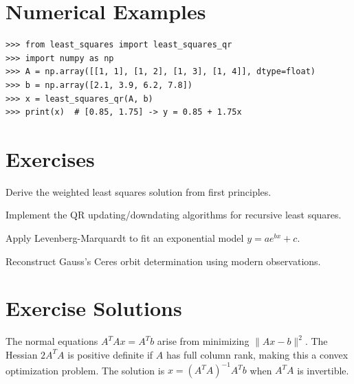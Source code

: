 \section{Numerical Examples}

\begin{example}
\begin{lstlisting}[style=python]
>>> from least_squares import least_squares_qr
>>> import numpy as np
>>> A = np.array([[1, 1], [1, 2], [1, 3], [1, 4]], dtype=float)
>>> b = np.array([2.1, 3.9, 6.2, 7.8])
>>> x = least_squares_qr(A, b)
>>> print(x)  # [0.85, 1.75] -> y = 0.85 + 1.75x
\end{lstlisting}
\end{example}

\section{Exercises}

\begin{exercise}
Derive the weighted least squares  solution from first principles.
\end{exercise}

\begin{exercise}
Implement the QR updating/downdating algorithms for recursive least squares.
\end{exercise}

\begin{exercise}
Apply Levenberg-Marquardt to fit an exponential model $y = a e^{bx} + c$.
\end{exercise}

\begin{exercise}
Reconstruct Gauss's Ceres orbit determination  using modern observations.
\end{exercise}



\section{Exercise Solutions}

\begin{solution}
The normal equations $A^TAx = A^Tb$ arise from minimizing $\|Ax - b\|^2$. The Hessian $2A^TA$ is positive definite if $A$ has full column rank, making this a convex optimization problem. The solution is $x = (A^TA)^{-1}A^Tb$ when $A^TA$ is invertible.
\end{solution}

